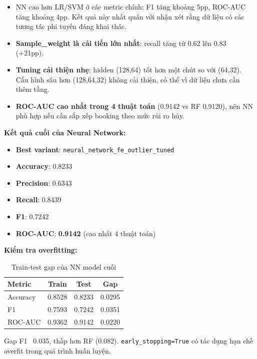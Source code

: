 \documentclass[12pt, a4paper]{article}
\begin{document}
\begin{itemize}
    \item NN cao hơn LR/SVM ở các metric chính: F1 tăng khoảng 5pp, ROC-AUC tăng khoảng 4pp. Kết quả này nhất quán với nhận xét rằng dữ liệu có các tương tác phi tuyến đáng khai thác.

    \item \textbf{Sample\_weight là cải tiến lớn nhất}: recall tăng từ 0.62 lên 0.83 (+21pp).

    \item \textbf{Tuning cải thiện nhẹ}: hidden (128,64) tốt hơn một chút so với (64,32). Cấu hình sâu hơn (128,64,32) không cải thiện, có thể vì dữ liệu chưa cần thêm tầng.

    \item \textbf{ROC-AUC cao nhất trong 4 thuật toán} (0.9142 vs RF 0.9120), nên NN phù hợp nếu cần sắp xếp booking theo mức rủi ro hủy.
\end{itemize}

\textbf{Kết quả cuối của Neural Network:}

\begin{itemize}
    \item \textbf{Best variant}: \texttt{neural\_network\_fe\_outlier\_tuned}
    \item \textbf{Accuracy}: 0.8233
    \item \textbf{Precision}: 0.6343
    \item \textbf{Recall}: 0.8439
    \item \textbf{F1}: 0.7242
    \item \textbf{ROC-AUC}: \textbf{0.9142} (cao nhất 4 thuật toán)
\end{itemize}

\textbf{Kiểm tra overfitting:}

\begin{table}[h!]
\centering
\caption{Train-test gap của NN model cuối}
\begin{tabular}{|l|c|c|c|}
\hline
\textbf{Metric} & \textbf{Train} & \textbf{Test} & \textbf{Gap} \\ \hline
Accuracy & 0.8528 & 0.8233 & 0.0295 \\ \hline
F1       & 0.7593 & 0.7242 & 0.0351 \\ \hline
ROC-AUC  & 0.9362 & 0.9142 & 0.0220 \\ \hline
\end{tabular}
\end{table}

Gap F1 ~0.035, thấp hơn RF (0.082). \texttt{early\_stopping=True} có tác dụng hạn chế overfit trong quá trình huấn luyện.
\end{document}
